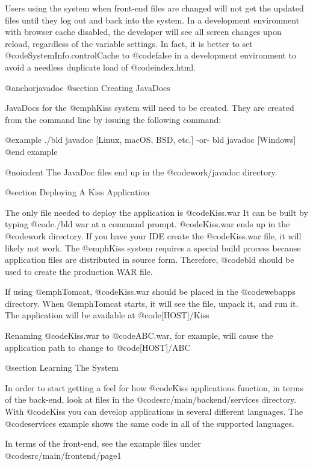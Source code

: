 Users using the system when front-end files are changed will not get
the updated files until they log out and back into the system.  In a
development environment with browser cache disabled, the developer
will see all screen changes upon reload, regardless of the variable settings.
In fact, it is better to set @code{SystemInfo.controlCache} to @code{false}
in a development environment to avoid a needless duplicate load of @code{index.html}.


@anchor{javadoc} @section Creating JavaDocs

JavaDocs for the @emph{Kiss} system will need to be created.  They are
created from the command line by issuing the following command:

@example
./bld javadoc              [Linux, macOS, BSD, etc.]
    -or-
bld javadoc                [Windows]
@end example

@noindent
The JavaDoc files end up in the @code{work/javadoc} directory.


@section Deploying A Kiss Application

The only file needed to deploy the application is @code{Kiss.war} It
can be built by typing @code{./bld war} at a command prompt.
@code{Kiss.war} ends up in the @code{work} directory.  If you
have your IDE create the @code{Kiss.war} file, it will likely not
work.  The @emph{Kiss} system requires a special build process because
application files are distributed in source form.  Therefore, @code{bld}
should be used to create the production WAR file.

If using @emph{Tomcat}, @code{Kiss.war} should be placed in the
@code{webapps} directory.  When @emph{Tomcat} starts, it will see the
file, unpack it, and run it.  The application will be available at
@code{[HOST]/Kiss}

Renaming @code{Kiss.war} to @code{ABC.war}, for example, will cause
the application path to change to @code{[HOST]/ABC}

@section Learning The System

In order to start getting a feel for how @code{Kiss} applications
function, in terms of the back-end, look at files in the
@code{src/main/backend/services} directory.  With @code{Kiss} you can
develop applications in several different languages.  The @code{services}
example shows the same code in all of the supported languages.

In terms of the front-end, see the example files under @code{src/main/frontend/page1}
